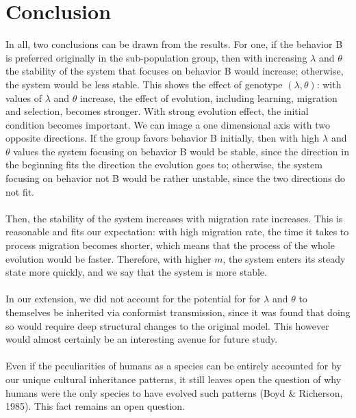 \documentclass[a4paper,8pt]{extarticle}
\begin{document}
\section{Conclusion}
In all, two conclusions can be drawn from the results. For one, if the behavior B is preferred originally in the sub-population group, then with increasing $\lambda$ and $\theta$ the stability of the system that focuses on behavior B would increase; otherwise, the system would be less stable. This shows the effect of genotype \mbox{$(\lambda,\theta)$}: with values of $\lambda$ and $\theta$ increase, the effect of evolution, including learning, migration and selection, becomes stronger. With strong evolution effect, the initial condition becomes important. We can image a one dimensional axis with two opposite directions. If the group favors behavior B initially, then with high $\lambda$ and $\theta$ values the system focusing on behavior B would be stable, since the direction in the beginning fits the direction the evolution goes to; otherwise, the system focusing on behavior not B would be rather unstable, since the two directions do not fit.
\\
\\
Then, the stability of the system increases with migration rate increases. This is reasonable and fits our expectation: with high migration rate, the time it takes to process migration becomes shorter, which means that the process of the whole evolution would be faster. Therefore, with higher $m$, the system enters its steady state more quickly, and we say that the system is more stable.
\\
\\
In our extension, we did not account for the potential for for $\lambda$ and $\theta$ to themselves be inherited via conformist transmission, since it was found that doing so would require deep structural changes to the original model. This however would almost certainly be an interesting avenue for future study.
\\
\\
Even if the peculiarities of humans as a species can be entirely accounted for by our unique cultural inheritance patterns, it still leaves open the question of why humans were the only species to have evolved such patterns (Boyd \& Richerson, 1985). This fact remains an open question.


\newpage
\end{document}

